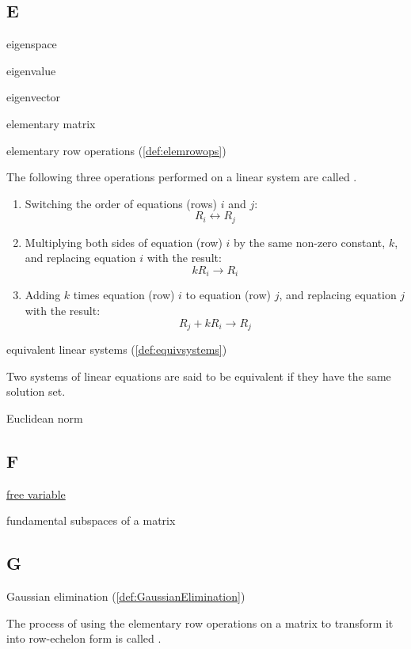 \documentclass{ximera}
\begin{document}
\subsection{E}

eigenspace

eigenvalue

eigenvector

elementary matrix

elementary row operations (\ref{def:elemrowops})
\begin{expandable}
    The following three operations performed on a linear system are called .
\begin{enumerate}
\item Switching the order of equations (rows) $i$ and $j$:
$$R_i\leftrightarrow R_j$$
\item Multiplying both sides of equation (row) $i$ by the same non-zero constant, $k$, and replacing equation $i$ with the result:
$$kR_i\rightarrow R_i$$
\item Adding $k$ times equation (row) $i$ to equation (row) $j$, and replacing equation $j$ with the result:
$$R_j+kR_i\rightarrow R_j$$
\end{enumerate}
\end{expandable}

equivalent linear systems (\ref{def:equivsystems})
\begin{expandable}
    Two systems of linear equations are said to be equivalent if they have the same solution set.
\end{expandable}

Euclidean norm


\subsection{F}

\href{https://ximera.osu.edu/oerlinalg/LinearAlgebra/SYS-0020/main}{free variable}

fundamental subspaces of a matrix


\subsection{G}

Gaussian elimination (\ref{def:GaussianElimination})
\begin{expandable}
    The process of using the elementary row operations on a matrix to transform it into row-echelon form is called .
\end{expandable}
\end{document}
